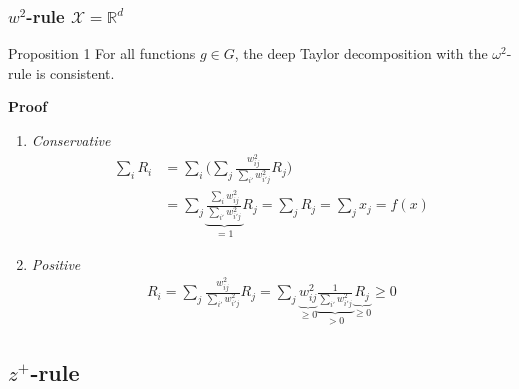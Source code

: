 \documentclass{beamer}
\begin{document}
\begin{frame}
\frametitle{$w^2$-rule $\mathcal{X}=\mathbb{R}^d$}
\vspace{0.3cm}
\begin{block}{Proposition 1}
For all functions $g \in G$, the deep Taylor decomposition with the $\omega^2$-rule is consistent.
\end{block}
\pause
\textbf{Proof}\\
\begin{enumerate}
\item \textit{Conservative}
\vspace{-0.2cm}
\begin{align*}
\sum_i R_i &= \sum_i\Big(\sum_j \frac{w_{ij}^2}{\sum_{i'}w_{i'j}^2}R_j\Big)\\
   		&= \sum_j \underbrace{\frac{\sum_i w_{ij}^2}{\sum_{i'} w_{i'j}^2}}_{=1}R_j = \sum_j R_j = \sum_j x_j = f(x)
\end{align*}
\vspace{-0.5cm}
\item \textit{Positive}
\begin{align*}
R_i = \sum_j \frac{w_{ij}^2}{\sum_{i'} w_{i'j}^2}R_j = \sum_j \underbrace{w_{ij}^2}_{\geq 0}  \underbrace{\frac{1}{\sum_{i'} w_{i'j}^2}}_{>0}  \underbrace{R_j}_{\geq 0} \geq 0
\end{align*}
\end{enumerate}


\end{frame}




\subsection[$z^+$-rule]{$z^+$-rule}
\end{document}
